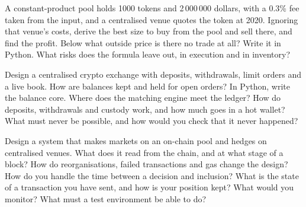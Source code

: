 \begin{question}\label{iq:iv3:smart-contracts-and-crypto-engineering:28}
A constant-product pool holds 1000 tokens and 2\,000\,000 dollars, with a 0.3\% fee taken from the input, and a centralised venue quotes the token at 2020. Ignoring that venue's costs, derive the best size to buy from the pool and sell there, and find the profit. Below what outside price is there no trade at all? Write it in Python. What risks does the formula leave out, in execution and in inventory?
\end{question}

\begin{question}\label{iq:iv3:smart-contracts-and-crypto-engineering:29}
Design a centralised crypto exchange with deposits, withdrawals, limit orders and a live book. How are balances kept and held for open orders? In Python, write the balance core. Where does the matching engine meet the ledger? How do deposits, withdrawals and custody work, and how much goes in a hot wallet? What must never be possible, and how would you check that it never happened?
\end{question}

\begin{question}\label{iq:iv3:smart-contracts-and-crypto-engineering:30}
Design a system that makes markets on an on-chain pool and hedges on centralised venues. What does it read from the chain, and at what stage of a block? How do reorganisations, failed transactions and gas change the design? How do you handle the time between a decision and inclusion? What is the state of a transaction you have sent, and how is your position kept? What would you monitor? What must a test environment be able to do?
\end{question}
